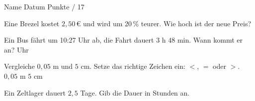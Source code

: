 \documentclass[11pt]{article}
\begin{document}
{}
\par\vspace{2pt}\noindent Name \underline{\hspace{7cm}}\hfill Datum \underline{\hspace{3cm}}\hfill Punkte \underline{\hspace{1.2cm}} / 17\par\vspace{6pt}
\small

\noindent\begin{minipage}[t]{0.485\linewidth}\raggedright
\begin{aufgabe}{Eine Brezel kostet $2{,}50\,€$ und wird um $20\,\%$ teurer. Wie hoch ist der neue Preis? \leerfeld[€]}
\end{aufgabe}
\end{minipage}\hfill\begin{minipage}[t]{0.485\linewidth}\raggedright
\begin{aufgabe}{Ein Bus fährt um 10:27 Uhr ab, die Fahrt dauert $3$ h $48$ min. Wann kommt er an? \leerfeld Uhr}
\end{aufgabe}
\end{minipage}\par

\noindent\begin{minipage}[t]{0.485\linewidth}\raggedright
\begin{aufgabe}{Vergleiche $0{,}05$ m und $5$ cm. Setze das richtige Zeichen ein: $<$, $=$ oder $>$. $0{,}05$ m \leerfeld $5$ cm}
\end{aufgabe}
\end{minipage}\hfill\begin{minipage}[t]{0.485\linewidth}\raggedright
\begin{aufgabe}{Ein Zeltlager dauert $2{,}5$ Tage. Gib die Dauer in Stunden an. \leerfeld[h]}
\end{aufgabe}
\end{minipage}\par
\end{document}
